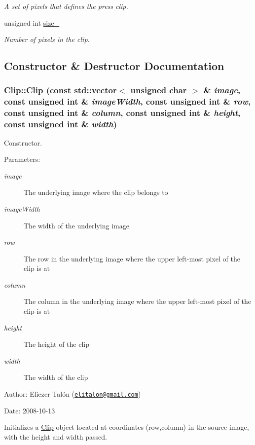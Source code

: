 \begin{CompactItemize}
\begin{CompactList}\small\item\em A set of pixels that defines the press clip. \item\end{CompactList}\item 
\hypertarget{class_clip_b88daf5fdd2b57dec8335ff8fd4a6d4e}{
unsigned int \hyperlink{class_clip_b88daf5fdd2b57dec8335ff8fd4a6d4e}{size\_\-}}
\label{class_clip_b88daf5fdd2b57dec8335ff8fd4a6d4e}

\begin{CompactList}\small\item\em Number of pixels in the clip. \item\end{CompactList}\end{CompactItemize}


\subsection{Constructor \& Destructor Documentation}
\hypertarget{class_clip_6264e0334483ad8e0631842a18ac5bc9}{
\subsubsection[Clip]{\setlength{\rightskip}{0pt plus 5cm}Clip::Clip (const std::vector$<$ unsigned char $>$ \& {\em image}, \/  const unsigned int \& {\em imageWidth}, \/  const unsigned int \& {\em row}, \/  const unsigned int \& {\em column}, \/  const unsigned int \& {\em height}, \/  const unsigned int \& {\em width})}}
\label{class_clip_6264e0334483ad8e0631842a18ac5bc9}


Constructor. 

\begin{Desc}
\item[Parameters:]
\begin{description}
\item[{\em image}]The underlying image where the clip belongs to \item[{\em imageWidth}]The width of the underlying image \item[{\em row}]The row in the underlying image where the upper left-most pixel of the clip is at \item[{\em column}]The column in the underlying image where the upper left-most pixel of the clip is at \item[{\em height}]The height of the clip \item[{\em width}]The width of the clip\end{description}
\end{Desc}
\begin{Desc}
\item[Author:]Eliezer Talón (\href{mailto:elitalon@gmail.com}{\tt elitalon@gmail.com}) \end{Desc}
\begin{Desc}
\item[Date:]2008-10-13\end{Desc}
Initializes a \hyperlink{class_clip}{Clip} object located at coordinates (row,column) in the source image, with the height and width passed. 


